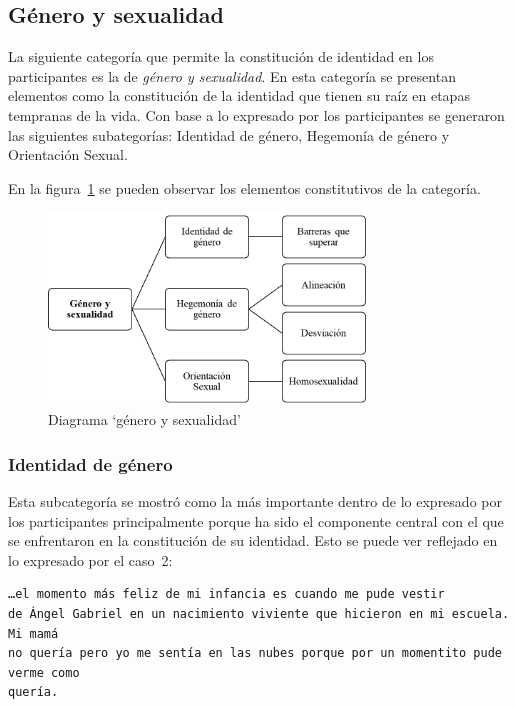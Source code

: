 \subsection{Género y sexualidad}

La siguiente categoría que permite la constitución de identidad en los
participantes es la de \emph{género y sexualidad}. En esta categoría se
presentan elementos como la constitución de la identidad que tienen su raíz en
etapas tempranas de la vida. Con base a lo expresado por los participantes se
generaron las siguientes subategorías: Identidad de género, Hegemonía de género
y Orientación Sexual.

En la figura~\ref{fig:genero} se pueden observar los elementos constitutivos de
la categoría.

\begin{figure}
    \centering
    \includegraphics[width=0.75\textwidth]{genero}
    \caption{Diagrama ‘género y sexualidad’}\label{fig:genero}
\end{figure}

\subsubsection{Identidad de género}

Esta subcategoría se mostró como la más importante dentro de lo expresado por
los participantes principalmente porque ha sido el componente central con
el que se enfrentaron en la constitución de su identidad. Esto se puede ver
reflejado en lo expresado por el caso~2:

\begin{verbatim}
…el momento más feliz de mi infancia es cuando me pude vestir
de Ángel Gabriel en un nacimiento viviente que hicieron en mi escuela. Mi mamá
no quería pero yo me sentía en las nubes porque por un momentito pude verme como
quería.
\end{verbatim}

